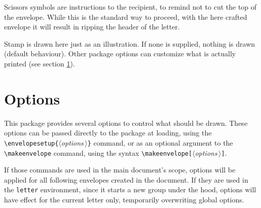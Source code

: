 \documentclass{article}
\newcommand{\optarg}[1]{$\langle$\textit{#1}\,$\rangle$}
\begin{document}
		Scissors symbols are instructions to the recipient, to remind not to cut the top of the envelope. While this is the standard way to proceed, with the here crafted envelope it will result in ripping the header of the letter.

		Stamp is drawn here just as an illustration. If none is supplied, nothing is drawn (default behaviour). Other package options can customize what is actually printed (see section \ref{sec:options}).

		\section{Options}\label{sec:options}
		This package provides several options to control what should be drawn. These options can be passed directly to the package at loading, using the \verb|\envelopesetup{|\optarg{options}\verb|}| command, or as an optional argument to the \verb|\makeenvelope| command, using the syntax \verb|\makeenvelope[|\optarg{options}\verb|]|.

		If those commands are used in the main document's scope, options will be applied for all following envelopes created in the document. If they are used in the \verb|letter| environment, since it starts a new group under the hood, options will have effect for the current letter only, temporarily overwriting global options.
\end{document}
